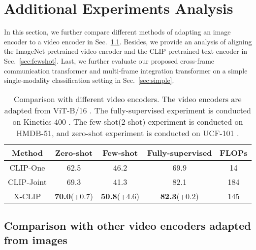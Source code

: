 \documentclass[runningheads]{llncs}
\begin{document}
\section{Additional Experiments Analysis}\label{sec:additional_exp}
In this section, we further compare different methods of adapting an image encoder to a video encoder in Sec.~\ref{sec:encoder}. Besides, we provide an analysis of aligning the ImageNet pretrained video encoder and the CLIP pretrained text encoder in Sec.~\ref{sec:fewshot}. Last, we further evaluate our proposed cross-frame communication transformer and multi-frame integration transformer on a simple single-modality classification setting in Sec.~\ref{sec:simple}. 
\begin{table}[tb!]
\vspace{-.2cm}
\centering
\caption{Comparison with different video encoders. The video encoders are adapted from ViT-B/16 \cite{clip}. The fully-supervised experiment is conducted on Kinetics-400 \cite{k400}. The few-shot(2-shot) experiment is conducted on HMDB-51, and zero-shot experiment is conducted on UCF-101 \cite{soomro2012ucf101}.}
\centering
\begin{tabular}{c|ccc|c}
  \toprule
  Method & Zero-shot & Few-shot & Fully-supervised & FLOPs\\
  \midrule
  CLIP-One & 62.5 & 46.2 & 69.9 & 14\\
  CLIP-Joint & 69.3 & 41.3 & 82.1 & 184 \\
  \midrule
  X-CLIP & \textbf{70.0}\scriptsize(+0.7) & \textbf{50.8}\scriptsize(+4.6) & \textbf{82.3}\scriptsize(+0.2) & 145 \\
  \bottomrule
  \end{tabular}
\label{tab:joint_mean}
\end{table} \subsection{Comparison with other video encoders adapted from images}\label{sec:encoder}
\end{document}
